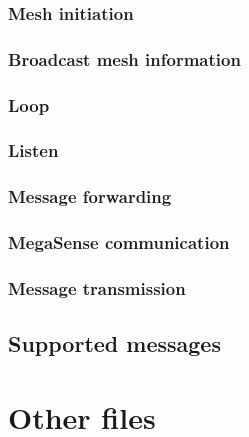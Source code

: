 			\subsubsection{Mesh initiation}
			
			\subsubsection{Broadcast mesh information}
			
			
			\subsubsection{Loop}
			
			\subsubsection{Listen}
			
			\subsubsection{Message forwarding}
			
			\subsubsection{MegaSense communication}
			
			\subsubsection{Message transmission}
			
		\subsection{Supported messages}
		
	\section{Other files}
	
		
